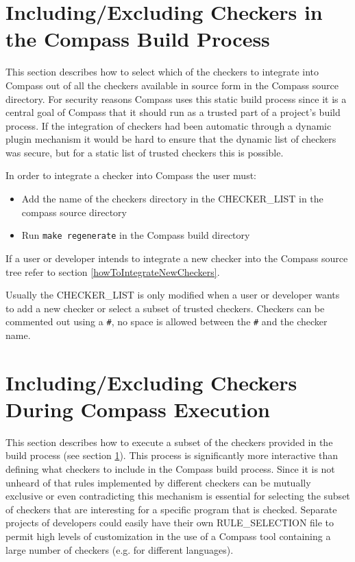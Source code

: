 \section{Including/Excluding Checkers in the Compass Build Process}
\label{CompassBuildProcess}

   This section describes how to select which of the checkers to integrate into Compass
out of all the checkers available in source form in the Compass source directory. For
security reasons Compass uses this static build process since it is a central goal
of Compass that it should run as a trusted part of a project's build process. If the
integration of checkers had been automatic through a dynamic plugin mechanism it
would be hard to ensure that the dynamic list of checkers was secure, but for a 
static list of trusted checkers this is possible.

In order to integrate a checker into Compass the user must:
\begin{itemize}
   \item Add the name of the checkers directory in the CHECKER\_LIST in the compass
      source directory
   \item Run {\tt make regenerate} in the Compass build directory
\end{itemize} 
If a user or developer intends to integrate a new checker into the Compass source
tree refer to section \ref{howToIntegrateNewCheckers}.

Usually the CHECKER\_LIST is only modified when a user or developer wants to 
add a new checker or select a subset of trusted checkers.  Checkers can be
commented out using a {\tt \#}, no space is allowed between the {\tt \#} 
and the checker name.


\section{Including/Excluding Checkers During Compass Execution}
\label{ruleselection}

   This section describes how to execute a subset of the checkers provided in the build
process (see section \ref{CompassBuildProcess}). This process is significantly more
interactive than defining what checkers to include in the Compass build process.
Since it is not unheard of that rules implemented by different checkers can be  
mutually exclusive or even contradicting this mechanism is essential for selecting the
subset of checkers that are interesting for a specific program that is checked.
Separate projects of developers could easily have their own RULE\_SELECTION file
to permit high levels of customization in the use of a Compass tool containing
a large number of checkers (e.g. for different languages).

